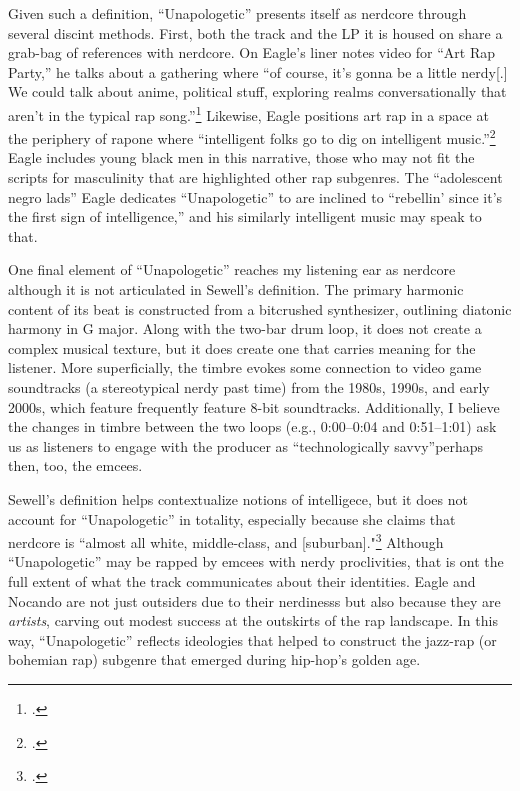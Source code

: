 Given such a definition, ``Unapologetic'' presents itself as nerdcore through several discint methods. 
First, both the track and the LP it is housed on share a grab-bag of references with nerdcore. On Eagle's
liner notes video for ``Art Rap Party,'' he talks about a gathering where ``of course, it's gonna be a 
little nerdy[.] \textellipsis We could talk about anime, \textellipsis political stuff, exploring realms
conversationally that aren't in the typical rap song.''\footnote{
    \cite{openmikeeagleVideoLinerNotes2010}.}
Likewise, Eagle positions art rap in a space at the periphery of rap\textemdash one where ``intelligent
folks go to dig on intelligent music.''\footnote{
    \cite{openmikeeagleVideoLinerNotes2010}.} 
Eagle includes young black men in this narrative, those who may not fit the scripts for masculinity that
are highlighted other rap subgenres. The ``adolescent negro lads'' Eagle dedicates ``Unapologetic'' to 
are inclined  to ``rebellin' since it's the first sign of intelligence,'' and his similarly intelligent
music may speak to that.

One final element of ``Unapologetic'' reaches my listening ear as nerdcore although it is not articulated
in Sewell's definition. The primary harmonic content of its beat is constructed from a bitcrushed synthesizer,
outlining diatonic harmony in G major. Along with the two-bar drum loop, it does not create a complex musical
texture, but it does create one that carries meaning for the listener. More superficially, the timbre evokes 
some connection to video game soundtracks (a stereotypical nerdy past time) from the 1980s, 1990s, and early 
2000s, which feature frequently feature 8-bit soundtracks. Additionally, I believe the changes in timbre 
between  the two loops (e.g., 0:00--0:04 and 0:51--1:01) ask us as listeners to engage with the producer 
as ``technologically savvy''\textemdash perhaps then, too, the emcees.

Sewell's definition helps contextualize notions of intelligece, but it does not account for ``Unapologetic''
in totality, especially because she claims that nerdcore is ``almost all white, middle-class, and 
[suburban]."\footnote{
    \autocite[223]{amandasewellNerdcoreHiphop2015}.} 
Although ``Unapologetic'' may be rapped by emcees with nerdy proclivities, that is ont the full extent of
what the track communicates about their identities. Eagle and Nocando are not just outsiders due to their 
nerdinesss but also because they are \emph{artists}, carving out modest success at the outskirts of the rap
landscape. In this way, ``Unapologetic'' reflects ideologies that helped to construct the jazz-rap (or bohemian
rap) subgenre that emerged during hip-hop's golden age.

